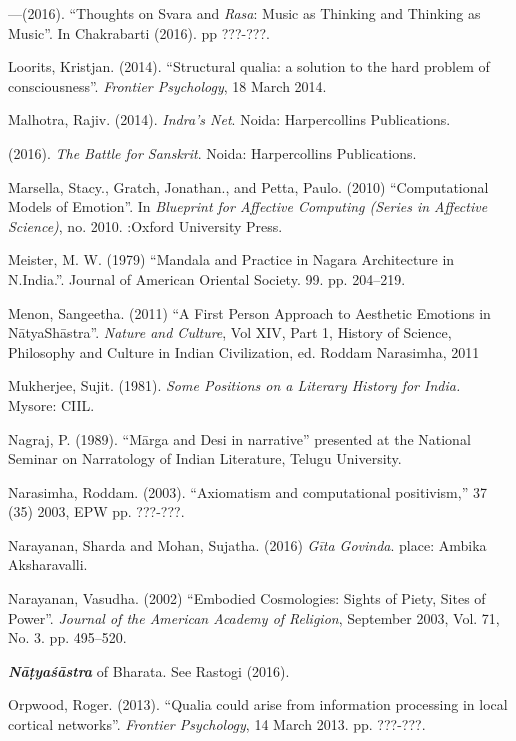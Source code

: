 \begin{thebibliography}{99}
---\kern3pt(2016). “Thoughts on Svara and \textsl{Rasa}: Music as Thinking and Thinking as Music”. In Chakrabarti (2016). pp ???-???.

Loorits, Kristjan. (2014). “Structural qualia: a solution to the hard problem of consciousness”. \textsl{Frontier Psychology}, 18 March 2014.

Malhotra, Rajiv. (2014). \textsl{Indra’s Net}. Noida: Harpercollins Publications.

\kern3pt(2016). \textsl{The Battle for Sanskrit}. Noida: Harpercollins Publications.

Marsella, Stacy., Gratch, Jonathan., and Petta, Paulo. (2010) “Computational Models of Emotion”. In \textsl{Blueprint for Affective Computing (Series in Affective Science)}, no. 2010. :Oxford University Press.

Meister, M. W. (1979) “Mandala and Practice in Nagara Architecture in N.India.”. Journal of American Oriental Society. 99. pp. 204--219.

Menon, Sangeetha. (2011) “A First Person Approach to Aesthetic Emotions in NātyaShāstra”. \textsl{Nature and Culture}, Vol XIV, Part 1, History of Science, Philosophy and Culture in Indian Civilization, ed. Roddam Narasimha, 2011

Mukherjee, Sujit. (1981). \textsl{Some Positions on a Literary History for India.} Mysore: CIIL.

Nagraj, P. (1989). “Mārga and Desi in narrative” presented at the National Seminar on Narratology of Indian Literature, Telugu University.

Narasimha, Roddam. (2003). “Axiomatism and computational positivism,” 37 (35) 2003, EPW pp. ???-???.

Narayanan, Sharda and Mohan, Sujatha. (2016) \textsl{Gīta Govinda}. place: Ambika Aksharavalli.

Narayanan, Vasudha. (2002) “Embodied Cosmologies: Sights of Piety, Sites of Power”. \textsl{Journal of the American Academy of Religion}, September 2003, Vol. 71, No. 3. pp. 495--520.

{\sl\bfseries Nāṭyaśāstra} of Bharata. See Rastogi (2016).

Orpwood, Roger. (2013). “Qualia could arise from information processing in local cortical networks”. \textsl{Frontier Psychology}, 14 March 2013. pp. ???-???.


\end{thebibliography}
